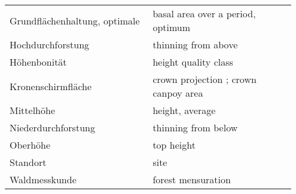 \begin{singlespace}
{\begin{longtabu}{p{0.475\linewidth} p{0.475\linewidth}}
      Grundflächenhaltung, optimale & basal area over a period, optimum \parencite[p.~229]{Assmann1970} \\
      Hochdurchforstung & thinning from above \\
      Höhenbonität & height quality class \parencite[p.~159]{Assmann1970} \\
      Kronenschirmfläche & crown projection \parencite[p.~157]{Assmann1970}; crown canpoy area \parencite[p.~158]{Assmann1970} \\
      Mittelhöhe & height, average \\
      Niederdurchforstung & thinning from below \\
      Oberhöhe & top height \\
      Standort & site \\
      Waldmesskunde & forest mensuration \\
    \end{longtabu}
  }
\end{singlespace}

